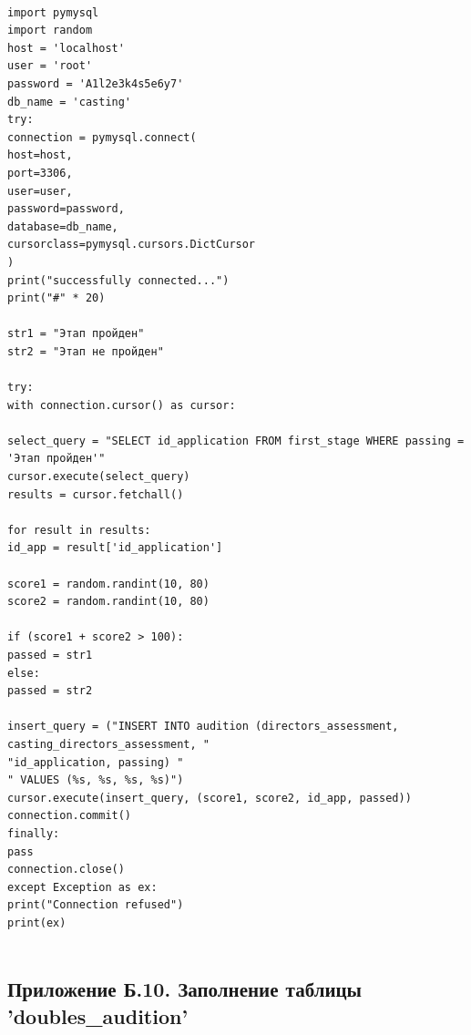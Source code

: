 \documentclass[11pt,a4paper,final]{article} %
\begin{document}
\begin{lstlisting}
	
import pymysql
import random
host = 'localhost'
user = 'root'
password = 'A1l2e3k4s5e6y7'
db_name = 'casting'
try:
connection = pymysql.connect(
host=host,
port=3306,
user=user,
password=password,
database=db_name,
cursorclass=pymysql.cursors.DictCursor
)
print("successfully connected...")
print("#" * 20)

str1 = "Этап пройден"
str2 = "Этап не пройден"

try:
with connection.cursor() as cursor:

select_query = "SELECT id_application FROM first_stage WHERE passing = 'Этап пройден'"
cursor.execute(select_query)
results = cursor.fetchall()

for result in results:
id_app = result['id_application']

score1 = random.randint(10, 80)
score2 = random.randint(10, 80)

if (score1 + score2 > 100):
passed = str1
else:
passed = str2

insert_query = ("INSERT INTO audition (directors_assessment, casting_directors_assessment, "
"id_application, passing) "
" VALUES (%s, %s, %s, %s)")
cursor.execute(insert_query, (score1, score2, id_app, passed))
connection.commit()
finally:
pass
connection.close()
except Exception as ex:
print("Connection refused")
print(ex)
	
\end{lstlisting}


\subsection*{Приложение Б.10. Заполнение таблицы 'doubles\_audition'}
\end{document}

